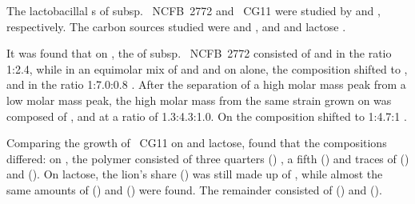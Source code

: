 The lactobacillal \eps{}s of  subsp. ~NCFB~2772 and ~CG11 were studied by \textcite{Grobben1996, Grobben1997} and \textcite{Cerning1994}, respectively. The carbon sources studied were \glc{} and \frc{} \cite{Grobben1996, Grobben1997}, and \glc{} and lactose \cite{Cerning1994}.

It was found that on \frc{}, the \eps{} of  subsp. ~NCFB~2772 consisted of \glc{} and \gal{} in the ratio 1:2.4, while in an equimolar mix of \glc{} and \frc{} and on \glc{} alone, the composition shifted to \glc{}, \gal{} and \rha{} in the ratio 1:7.0:0.8 \cite{Grobben1996}. After the separation of a high molar mass peak from a low molar mass peak, the high molar mass \eps{} from the same strain grown on \frc{} was composed of \glc{}, \gal{} and \rha{} at a ratio of 1.3:4.3:1.0. On \glc{} the composition shifted to 1:4.7:1 \cite{Grobben1997}.

Comparing the growth of ~CG11 on \glc{} and lactose, \textcite{Cerning1994} found that the \eps{} compositions differed: on \glc{}, the polymer consisted of three quarters () \glc{}, a fifth () \rha{} and traces of \gal{} () and \man{} (). On lactose, the lion's share () was still made up of \glc{}, while almost the same amounts of \rha{} () and \gal{} () were found. The remainder consisted of \man{} () and \xyl{} ().

